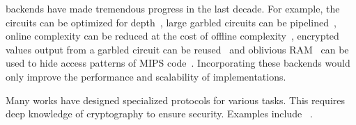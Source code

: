 \mpc backends  have made  tremendous progress in the last decade.
For example, the circuits can be optimized for depth~\cite{ddkssz15,cbmcgcdepth}, large garbled circuits can be pipelined~\cite{yao-pipe,oblivm}, online complexity can be reduced at the cost of offline complexity~\cite{groce}, encrypted values output from a garbled circuit can be reused~\cite{ReuseOrLose} and oblivious RAM~\cite{oram1,oram2} can be used to hide access patterns of MIPS code~\cite{mips}. 
Incorporating these backends would only improve the performance and scalability of \tool implementations. 

Many works have designed specialized protocols for various \mpc tasks. 
This requires deep knowledge of cryptography
to ensure security.
 Examples include ~\cite{barni,blanton,brickell,franz,huang,valeriaMatrix, valeriaRidge,shafindss,wu,secureml,minionn}.


